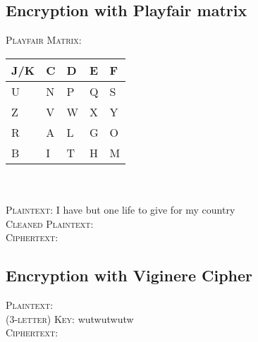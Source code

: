 \documentclass{report}
\begin{document}
		\subsection{Encryption with Playfair matrix}
		\startsubsection
			\textsc{Playfair Matrix}:
			\begin{tabular}{|M{0.3cm}|M{0.3cm}|M{0.3cm}|M{0.3cm}|M{0.3cm}|}
				\hline
				\hspace*{-0.4em} J/K & C & D & E & F \\
				\hline
				U & N & P & Q & S \\
				\hline
				Z & V & W & X & Y \\
				\hline
				R & A & L & G & O \\
				\hline
				B & I & T & H & M \\
				\hline
			\end{tabular}
			\hfill \\ \\
			\textsc{Plaintext}:  I have but one life to give for my country \\
			\textsc{Cleaned Plaintext}:  \\
			\textsc{Ciphertext}: 
		\closesection
		\subsection{Encryption with Viginere Cipher}
		\startsubsection
			\textsc{Plaintext}:  \\
			\textsc{(3-letter) Key}: wutwutwutw \\
			\textsc{Ciphertext}: 
		\closesection
	\closesection
\end{document}
